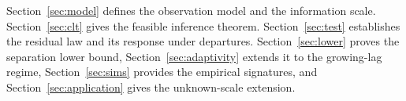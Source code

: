 Section~\ref{sec:model} defines the observation model and the information
scale. Section~\ref{sec:clt} gives the feasible inference theorem.
Section~\ref{sec:test} establishes the residual law and its response
under departures. Section~\ref{sec:lower} proves the separation lower bound,
Section~\ref{sec:adaptivity} extends it to the growing-lag regime,
Section~\ref{sec:sims} provides the empirical signatures, and
Section~\ref{sec:application} gives the unknown-scale extension.
